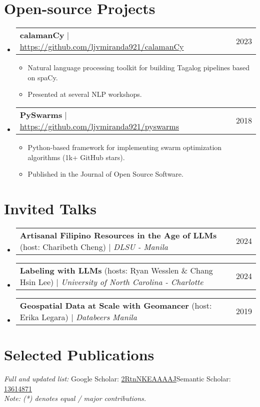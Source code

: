 \documentclass[a4paper,11pt]{article}
\makeatletter
\newcommand{\resumeItem}[1]{
  \item\small{
    {#1 \vspace{-2pt}}
  }
}
\newcommand{\resumeProjectHeading}[2]{
    \item
    \begin{tabular*}{0.97\textwidth}{l@{\extracolsep{\fill}}r}
      \small#1 & #2 \\
    \end{tabular*}\vspace{-7pt}
}
\newcommand{\resumeSubHeadingListStart}{\begin{itemize}[leftmargin=0.15in, label={}]}
\newcommand{\resumeSubHeadingListEnd}{\end{itemize}}
\newcommand{\resumeItemListStart}{\begin{itemize}}
\newcommand{\resumeItemListEnd}{\end{itemize}\vspace{-5pt}}
\makeatother
\begin{document}
\section{Open-source Projects}
\resumeSubHeadingListStart
\resumeProjectHeading
{\textbf{calamanCy} $|$ \url{https://github.com/ljvmiranda921/calamanCy}}{2023}
\resumeItemListStart
\resumeItem{Natural language processing toolkit for building Tagalog pipelines based on spaCy.}
\resumeItem{Presented at several NLP workshops.}
\resumeItemListEnd
\resumeProjectHeading
{\textbf{PySwarms} $|$ \url{https://github.com/ljvmiranda921/pyswarms}}{2018}
\resumeItemListStart
\resumeItem{Python-based framework for implementing swarm optimization algorithms (1k+ GitHub stars).}
\resumeItem{Published in the Journal of Open Source Software.}
\resumeItemListEnd
\resumeSubHeadingListEnd

\section{Invited Talks}
\resumeSubHeadingListStart
\resumeProjectHeading
{\textbf{Artisanal Filipino Resources in the Age of LLMs} (host: Charibeth Cheng) $|$ \emph{DLSU - Manila}}{2024}
\resumeProjectHeading
{\textbf{Labeling with LLMs} (hosts: Ryan Wesslen \& Chang Hsin Lee) $|$ \emph{University of North Carolina - Charlotte}}{2024}
\resumeProjectHeading
{\textbf{Geospatial Data at Scale with Geomancer} (host: Erika Legara) $|$ \emph{Databeers Manila}}{2019}
\resumeSubHeadingListEnd

\newpage

\section{Selected Publications}
\textit{Full and updated list:} Google Scholar: \href{https://scholar.google.com/citations?user=2RtnNKEAAAAJ&hl=en}{2RtnNKEAAAAJ}\quad Semantic Scholar: \href{https://www.semanticscholar.org/author/Lester-James-Validad-Miranda/13614871}{13614871}\\
\textit{Note: (*) denotes equal / major contributions.}
\end{document}
